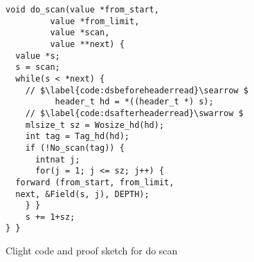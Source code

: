 \begin{figure}[t]
\vspace{-1ex}
  \begin{lstlisting}
void do_scan(value *from_start,  
	     value *from_limit, 
	     value *scan,  
 	     value **next) {
  value *s;
  s = scan;
  while(s < *next) {
    // $\label{code:dsbeforeheaderread}\searrow $
          header_t hd = *((header_t *) s);
    // $\label{code:dsafterheaderread}\swarrow $
    mlsize_t sz = Wosize_hd(hd);
    int tag = Tag_hd(hd);
    if (!No_scan(tag)) {
      intnat j;
      for(j = 1; j <= sz; j++) {
  forward (from_start, from_limit, 
  next, &Field(s, j), DEPTH);
    } }
    s += 1+sz;
} }
\end{lstlisting}

\vspace{-0.4em}
\caption{Clight code and proof sketch for do scan}
\label{fig:doscan}
\vspace{-1em}
\end{figure}